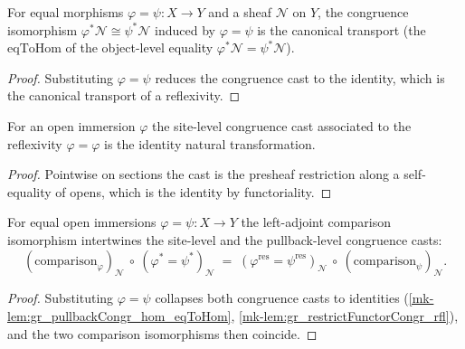 \begin{lemma}\label{mk-lem:gr_pullbackCongr_hom_eqToHom}
  \leanok

  For equal morphisms \(\varphi = \psi : X \to Y\) and a sheaf \(\mathcal{N}\) on \(Y\),
  the congruence isomorphism \(\varphi^{*}\mathcal{N} \cong \psi^{*}\mathcal{N}\)
  induced by \(\varphi = \psi\) is the canonical transport (the \(\mathrm{eqToHom}\) of
  the object-level equality \(\varphi^{*}\mathcal{N} = \psi^{*}\mathcal{N}\)).
\end{lemma}
\begin{proof}
  \leanok

Substituting \(\varphi = \psi\) reduces the congruence cast to the identity, which is
  the canonical transport of a reflexivity.
\end{proof}

\begin{lemma}\label{mk-lem:gr_restrictFunctorCongr_rfl}
  \leanok

  For an open immersion \(\varphi\) the site-level congruence cast associated to the
  reflexivity \(\varphi = \varphi\) is the identity natural transformation.
\end{lemma}
\begin{proof}
  \leanok

Pointwise on sections the cast is the presheaf restriction along a self-equality of
  opens, which is the identity by functoriality.
\end{proof}

\begin{lemma}\label{mk-lem:gr_restrictIsoPullback_congr}
  \leanok

  For equal open immersions \(\varphi = \psi : X \to Y\) the left-adjoint comparison
  isomorphism intertwines the site-level and the pullback-level congruence casts:
  \[
    (\text{comparison}_\varphi)_{\mathcal{N}}\ \circ\
      (\varphi^{*}\!=\psi^{*})_{\mathcal{N}}
    \;=\;
    (\varphi^{\mathrm{res}}\!=\psi^{\mathrm{res}})_{\mathcal{N}}\ \circ\
      (\text{comparison}_\psi)_{\mathcal{N}}.
  \]
\end{lemma}
\begin{proof}
  \leanok
  Substituting \(\varphi = \psi\) collapses both congruence casts to identities
  (\ref{mk-lem:gr_pullbackCongr_hom_eqToHom}, \ref{mk-lem:gr_restrictFunctorCongr_rfl}),
  and the two comparison isomorphisms then coincide.
\end{proof}

